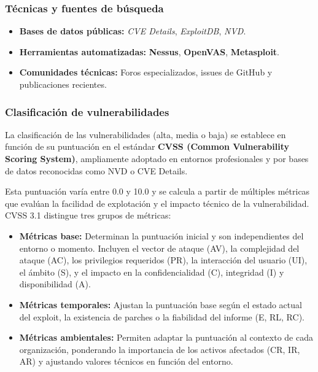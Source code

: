 \documentclass[a4paper, 11pt]{article}
\begin{document}
\subsubsection*{Técnicas y fuentes de búsqueda}

\begin{itemize}
    \item \textbf{Bases de datos públicas:} \textit{CVE Details}, \textit{ExploitDB}, \textit{NVD}.
    \item \textbf{Herramientas automatizadas:} \textbf{Nessus}, \textbf{OpenVAS}, \textbf{Metasploit}.
    \item \textbf{Comunidades técnicas:} Foros especializados, issues de GitHub y publicaciones recientes.
\end{itemize}



\subsubsection{Clasificación de vulnerabilidades}

La clasificación de las vulnerabilidades (alta, media o baja) se establece en función de su puntuación en el estándar \textbf{CVSS (Common Vulnerability Scoring System)}, ampliamente adoptado en entornos profesionales y por bases de datos reconocidas como NVD o CVE Details. \cite{cvss}

Esta puntuación varía entre 0.0 y 10.0 y se calcula a partir de múltiples métricas que evalúan la facilidad de explotación y el impacto técnico de la vulnerabilidad. CVSS 3.1 distingue tres grupos de métricas:

\begin{itemize}
\item \textbf{Métricas base:} Determinan la puntuación inicial y son independientes del entorno o momento. Incluyen el vector de ataque (AV), la complejidad del ataque (AC), los privilegios requeridos (PR), la interacción del usuario (UI), el ámbito (S), y el impacto en la confidencialidad (C), integridad (I) y disponibilidad (A).

\item \textbf{Métricas temporales:} Ajustan la puntuación base según el estado actual del exploit, la existencia de parches o la fiabilidad del informe (E, RL, RC).

\item \textbf{Métricas ambientales:} Permiten adaptar la puntuación al contexto de cada organización, ponderando la importancia de los activos afectados (CR, IR, AR) y ajustando valores técnicos en función del entorno.
\end{itemize}
\end{document}

